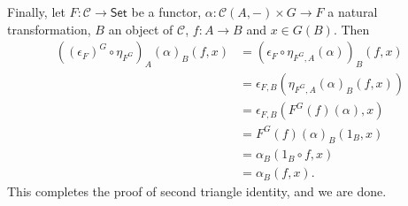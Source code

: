 Finally, let $F\colon \mathcal{C}\to \mathsf{Set}$ be a functor,
$\alpha\colon \mathcal{C}(A, {-})\times G\to F$ a natural transformation,
$B$ an object of $\mathcal{C}$, $f\colon A\to B$ and $x \in G(B)$. Then
\begin{align*}
	((\epsilon_F)^G \circ\eta_{F^G})_A(\alpha)_B(f, x)
	&= (\epsilon_F \circ\eta_{F^G, A}(\alpha))_B(f, x)\\
	&= \epsilon_{F, B}(\eta_{F^G, A}(\alpha)_B(f, x))\\
	&= \epsilon_{F, B}(F^G(f)(\alpha), x)\\
	&= F^G(f)(\alpha)_B(1_B, x)\\
	&= \alpha_B(1_B \circ f, x)\\
	&= \alpha_B(f, x).
\end{align*}
This completes the proof of second triangle identity, and we are done.

